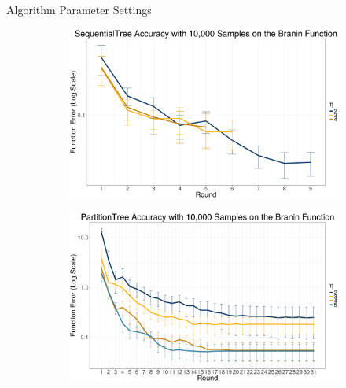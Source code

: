 \documentclass[final]{beamer}
\newlength{\onecolwid}
\begin{document}
\begin{frame}[t]
\begin{columns}[t]
\begin{column}{\onecolwid}
\begin{block}{Algorithm Parameter Settings}
\begin{figure}[H]
  \begin{subfigure}[t]{\textwidth}
    \includegraphics[width=\textwidth]{seq_tree_error_per_round.png}
  \end{subfigure}

  \begin{subfigure}[t]{\textwidth}
    \includegraphics[width=\textwidth]{part_tree_error_per_round.png}
  \end{subfigure}
\end{figure}
\end{block}





\end{column}
\end{columns}
\end{frame}
\end{document}
